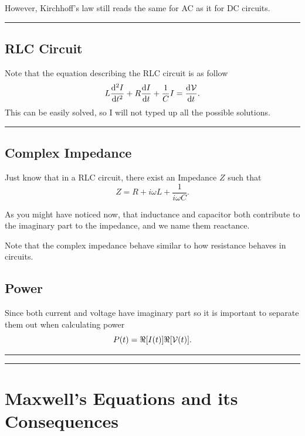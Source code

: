 \documentclass[12pt,english]{article}
\numberwithin{equation}{subsection}
\begin{document}
However, Kirchhoff's law still reads the same for AC as it for DC circuits.

\par\noindent\rule{\textwidth}{0.4pt}

\subsection{RLC Circuit}
Note that the equation describing the RLC circuit is as follow
\begin{equation}
    L \dv[2]{I}{t} +R \dv{I}{t} + \frac{1}{C} I = \dv[]{\mathcal{V}}{t}.
\end{equation}
This can be easily solved, so I will not typed up all the possible solutions.

\par\noindent\rule{\textwidth}{0.4pt}
\subsection{Complex Impedance}
Just know that in a RLC circuit, there exist an Impedance $Z$ such that 
\begin{equation}
    Z = R + i \omega L + \frac{1}{i \omega C}.
\end{equation}

As you might have noticed now, that inductance and capacitor both contribute to the imaginary part to the impedance, and we name them reactance. 

Note that the complex impedance behave similar to how resistance behaves in circuits.

\subsection{Power}
Since both current and voltage have imaginary part so it is important to separate them out when calculating power
\begin{equation}
    P(t) = \real[I(t)]\real[\mathcal{V}(t)].
\end{equation}










\par\noindent\rule{\textwidth}{0.4pt}
\par\noindent\rule{\textwidth}{0.4pt}

\section{Maxwell's Equations and its Consequences}
\end{document}
